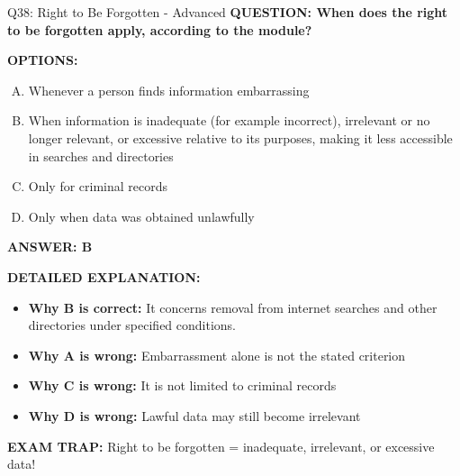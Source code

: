 \documentclass[8pt]{beamer}
\begin{document}
\begin{frame}[shrink=6]{Q38: Right to Be Forgotten - Advanced}
\fontsize{6.5}{7.5}\selectfont
\textbf{QUESTION: When does the right to be forgotten apply, according to the module?}

\vspace{0.1cm}
\textbf{OPTIONS:}
\begin{enumerate}[A.]
\item Whenever a person finds information embarrassing
\item When information is inadequate (for example incorrect), irrelevant or no longer relevant, or excessive relative to its purposes, making it less accessible in searches and directories
\item Only for criminal records
\item Only when data was obtained unlawfully
\end{enumerate}

\vspace{0.1cm}
\textcolor{myblue}{\textbf{ANSWER: B}}

\vspace{0.1cm}
\textbf{DETAILED EXPLANATION:}
\begin{itemize}
\item \textbf{Why B is correct:} It concerns removal from internet searches and other directories under specified conditions.
\item \textbf{Why A is wrong:} Embarrassment alone is not the stated criterion
\item \textbf{Why C is wrong:} It is not limited to criminal records
\item \textbf{Why D is wrong:} Lawful data may still become irrelevant
\end{itemize}

\textcolor{myred}{\textbf{EXAM TRAP:}} Right to be forgotten = inadequate, irrelevant, or excessive data!
\end{frame}
\end{document}
